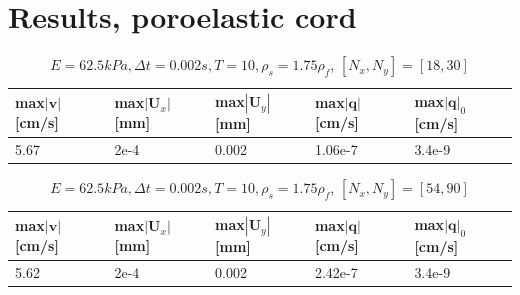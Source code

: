 \section{Results, poroelastic cord}
\begin{table}[!h]
\begin{center}
  \begin{tabular}{ l | l | l | l | l }
    max$|\mathbf{v}|$[cm/s] & max$|\mathbf{U}_x|$[mm] & max$|\mathbf{U}_y|$[mm] & max$|\mathbf{q}|$[cm/s] & max$|\mathbf{q}|_0$[cm/s]\\ \hline
    5.67 & 2e-4 & 0.002 & 1.06e-7 & 3.4e-9 \\ \hline
    \hline
  \end{tabular}
  \end{center}
  \caption{$E = 62.5 kPa, \Delta t = 0.002s, T = 10, \rho_s = 1.75\rho_f$, $[N_x,N_y]=[18,30]$}
\end{table}
\begin{table}[!h]
\begin{center}
  \begin{tabular}{ l | l | l | l | l }
    max$|\mathbf{v}|$[cm/s] & max$|\mathbf{U}_x|$[mm] & max$|\mathbf{U}_y|$[mm] & max$|\mathbf{q}|$[cm/s] & max$|\mathbf{q}|_0$[cm/s]\\ \hline
    5.62 & 2e-4 & 0.002 & 2.42e-7 & 3.4e-9 \\ \hline
    \hline
  \end{tabular}
  \end{center}
  \caption{$E = 62.5 kPa, \Delta t = 0.002s, T = 10, \rho_s = 1.75\rho_f$, $[N_x,N_y]=[54,90]$}
\end{table}

